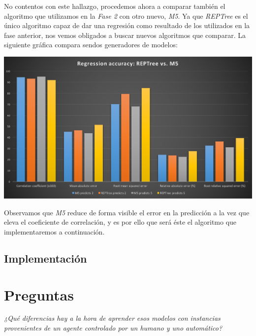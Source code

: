 \documentclass[12pt]{article}
\begin{document}
\vspace{0.3cm}

No contentos con este hallazgo, procedemos ahora a comparar también el algoritmo que utilizamos en la \emph{Fase 2} con otro nuevo, \emph{M5}. Ya que \emph{REPTree} es el único algoritmo capaz de dar una regresión como resultado de los utilizados en la fase anterior, nos vemos obligados a buscar nuevos algoritmos que comparar. La siguiente gráfica compara sendos generadores de modelos:

\vspace{0.3cm}

\noindent \includegraphics[width=\textwidth]{REPTree_vs_M5}

\vspace{0.3cm}

Observamos que \emph{M5} reduce de forma visible el error en la predicción a la vez que eleva el coeficiente de correlación, y es por ello que será éste el algoritmo que implementaremos a continuación.

\subsection{Implementación}

\newpage
\section{Preguntas}

\begin{center}
    \vspace{0.5cm} \emph{¿Qué diferencias hay a la hora de aprender esos modelos con instancias provenientes de un agente controlado por un humano y uno automático?}
    \vspace{0.5cm}
\end{center}
\end{document}
